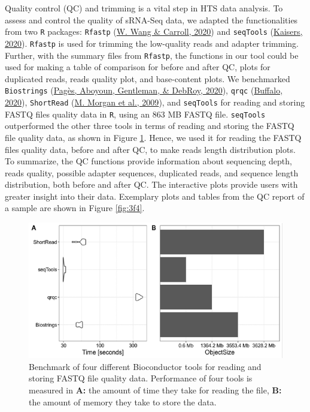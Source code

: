 \documentclass[12pt,twoside]{reedthesis}
\begin{document}
Quality control (QC) and trimming is a vital step in HTS data analysis.
To assess and control the quality of sRNA-Seq data, we adapted the
functionalities from two \texttt{R} packages: \texttt{Rfastp} (\protect\hyperlink{ref-wang2020}{W. Wang \& Carroll, 2020}) and \texttt{seqTools}
(\protect\hyperlink{ref-kaisers2020}{Kaisers, 2020}). \texttt{Rfastp} is used for trimming the low-quality reads and
adapter trimming. Further, with the summary files from \texttt{Rfastp}, the
functions in our tool could be used for making a table of comparison for
before and after QC, plots for duplicated reads, reads quality plot, and
base-content plots. We benchmarked \texttt{Biostrings} (\protect\hyperlink{ref-paguxe8s2020}{Pagès, Aboyoun, Gentleman, \& DebRoy, 2020}), \texttt{qrqc}
(\protect\hyperlink{ref-buffalo2020}{Buffalo, 2020}), \texttt{ShortRead} (\protect\hyperlink{ref-morgan2009}{M. Morgan et al., 2009}), and \texttt{seqTools} for reading and
storing FASTQ files quality data in \texttt{R}, using an 863 MB FASTQ file.
\texttt{seqTools} outperformed the other three tools in terms of reading and
storing the FASTQ file quality data, as shown in Figure \ref{fig:3f3}. Hence, we
used it for reading the FASTQ files quality data, before and after QC,
to make reads length distribution plots. To summarize, the QC functions
provide information about sequencing depth, reads quality, possible
adapter sequences, duplicated reads, and sequence length distribution,
both before and after QC. The interactive plots provide users with
greater insight into their data. Exemplary plots and tables from the QC
report of a sample are shown in Figure \ref{fig:3f4}.


\begin{figure}[htbp]

{\centering \includegraphics{thesis_files/figure-latex/3f3-1} 

}

\caption[Benchmark of four different Bioconductor tools for reading and storing FASTQ file quality data]{Benchmark of four different Bioconductor tools for reading and storing FASTQ file quality data. Performance of four tools is measured in \textbf{A:} the amount of time they take for reading the file, \textbf{B:} the amount of memory they take to store the data.}\label{fig:3f3}
\end{figure}
\end{document}
